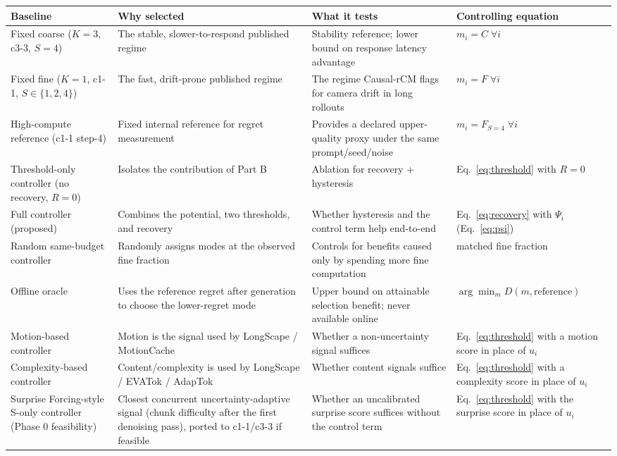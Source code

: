 \documentclass[11pt,a4paper]{article}
\begin{document}
\begin{table}[t]
\centering
\small
\renewcommand{\arraystretch}{1.35}
\begin{tabularx}{\textwidth}{>{\raggedright\arraybackslash}p{3.4cm} >{\raggedright\arraybackslash}X >{\raggedright\arraybackslash}X >{\raggedright\arraybackslash}p{3.0cm}}
\toprule
\textbf{Baseline} & \textbf{Why selected} & \textbf{What it tests} & \textbf{Controlling equation} \\
\midrule
Fixed coarse ($K{=}3$, c3-3, $S{=}4$) & The stable, slower-to-respond published regime & Stability reference; lower bound on response latency advantage & $m_i = C \;\forall i$ \\
Fixed fine ($K{=}1$, c1-1, $S\in\{1,2,4\}$) & The fast, drift-prone published regime & The regime Causal-rCM flags for camera drift in long rollouts & $m_i = F \;\forall i$ \\
High-compute reference (c1-1 step-4) & Fixed internal reference for regret measurement & Provides a declared upper-quality proxy under the same prompt/seed/noise & $m_i = F_{S=4} \;\forall i$ \\
Threshold-only controller (no recovery, $R=0$) & Isolates the contribution of Part B & Ablation for recovery + hysteresis & Eq.~\eqref{eq:threshold} with $R=0$ \\
Full controller (proposed) & Combines the potential, two thresholds, and recovery & Whether hysteresis and the control term help end-to-end & Eq.~\eqref{eq:recovery} with $\Psi_i$ (Eq.~\eqref{eq:psi}) \\
Random same-budget controller & Randomly assigns modes at the observed fine fraction & Controls for benefits caused only by spending more fine computation & matched fine fraction \\
Offline oracle & Uses the reference regret after generation to choose the lower-regret mode & Upper bound on attainable selection benefit; never available online & $\arg\min_m D(m,\text{reference})$ \\
Motion-based controller & Motion is the signal used by LongScape / MotionCache & Whether a non-uncertainty signal suffices & Eq.~\eqref{eq:threshold} with a motion score in place of $u_i$ \\
Complexity-based controller & Content/complexity is used by LongScape / EVATok / AdapTok & Whether content signals suffice & Eq.~\eqref{eq:threshold} with a complexity score in place of $u_i$ \\
Surprise Forcing-style S-only controller (Phase 0 feasibility) & Closest concurrent uncertainty-adaptive signal (chunk difficulty after the first denoising pass), ported to c1-1/c3-3 if feasible & Whether an uncalibrated surprise score suffices without the control term & Eq.~\eqref{eq:threshold} with the surprise score in place of $u_i$ \\

\end{tabularx}
\end{table}
\end{document}
